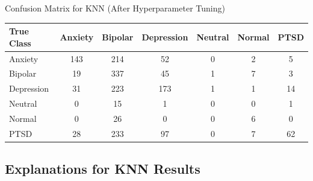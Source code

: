 \begin{center}
\caption{Confusion Matrix for KNN (After Hyperparameter Tuning)}
\begin{tabular}{|l|c|c|c|c|c|c|}
\hline
\textbf{True Class} & \textbf{Anxiety} & \textbf{Bipolar} & \textbf{Depression} & \textbf{Neutral} & \textbf{Normal} & \textbf{PTSD} \\ \hline
Anxiety             & 143              & 214              & 52                  & 0                & 2               & 5             \\ \hline
Bipolar             & 19               & 337              & 45                  & 1                & 7               & 3             \\ \hline
Depression          & 31               & 223              & 173                 & 1                & 1               & 14            \\ \hline
Neutral             & 0                & 15               & 1                   & 0                & 0               & 1             \\ \hline
Normal              & 0                & 26               & 0                   & 0                & 6               & 0             \\ \hline
PTSD                & 28               & 233              & 97                  & 0                & 7               & 62            \\ \hline
\end{tabular}
\end{center}

\subsection{Explanations for KNN Results}

